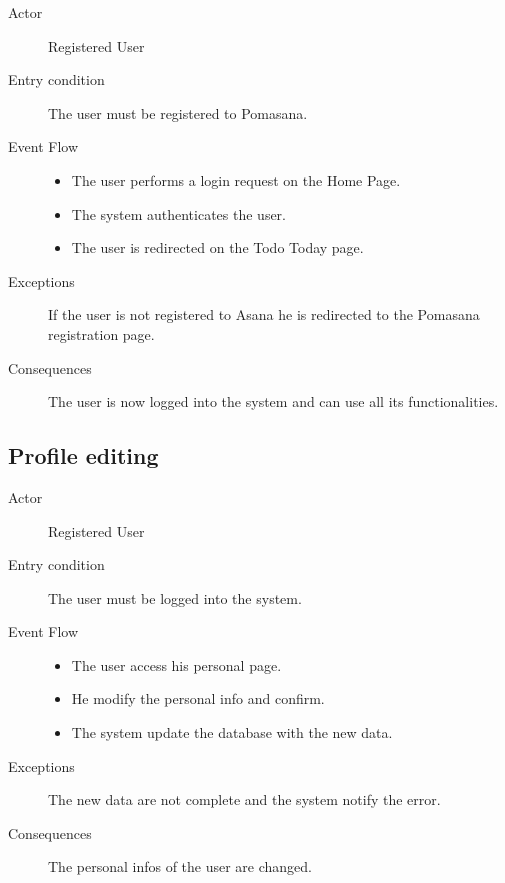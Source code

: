 			\begin{description}

				\item[Actor] Registered User
			
				\item[Entry condition] The user must be registered to Pomasana.

				\item[Event Flow]\hfill

					\begin{itemize}

						\item The user performs a login request on the Home Page.

						\item The system authenticates the user. 

						\item The user is redirected on the Todo Today page.

					\end{itemize}

				\item[Exceptions] If the user is not registered to Asana he is redirected to the Pomasana registration page.

				\item[Consequences] The user is now logged into the system and can use all its functionalities.

			\end{description}

		\subsection{Profile editing}

			\begin{description}

				\item[Actor] Registered User
			
				\item[Entry condition] The user must be logged into the system.

				\item[Event Flow]\hfill

					\begin{itemize}

						\item The user access his personal page.

						\item He modify the personal info and confirm.

						\item The system update the database with the new data.

					\end{itemize}

				\item[Exceptions] The new data are not complete and the system notify the error.

				\item[Consequences] The personal infos of the user are changed.

			\end{description}

